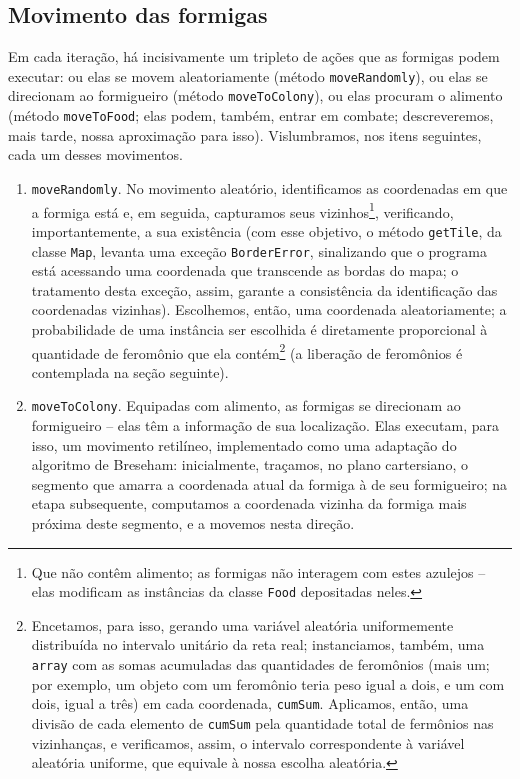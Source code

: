 \documentclass[12pt]{article}
\theoremstyle{definition}
\begin{document}
\subsection{Movimento das formigas} 

Em cada iteração, há incisivamente um tripleto de ações que as formigas podem executar: ou elas se movem aleatoriamente (método \texttt{moveRandomly}), ou elas se direcionam ao formigueiro (método \texttt{moveToColony}), ou elas procuram o alimento (método \texttt{moveToFood}; elas podem, também, entrar em combate; descreveremos, mais tarde, nossa aproximação para isso). Vislumbramos, nos itens seguintes, cada um desses movimentos. 

\begin{enumerate} 
	\item \texttt{moveRandomly}. No movimento aleatório, identificamos as coordenadas em que a formiga está e, em seguida, capturamos seus vizinhos\footnote{Que não contêm alimento; as formigas não interagem com estes azulejos -- elas modificam as instâncias da classe \texttt{Food} depositadas neles.}, verificando, importantemente, a sua existência (com esse objetivo, o método \texttt{getTile}, da classe \texttt{Map}, levanta uma exceção \texttt{BorderError}, sinalizando que o programa está acessando uma coordenada que transcende as bordas do mapa; o tratamento desta exceção, assim, garante a consistência da identificação das coordenadas vizinhas). Escolhemos, então, uma coordenada aleatoriamente; a probabilidade de uma instância ser escolhida é diretamente proporcional à quantidade de feromônio que ela contém\footnote{Encetamos, para isso, gerando uma variável aleatória uniformemente distribuída no intervalo unitário da reta real; instanciamos, também, uma \texttt{array} com as somas acumuladas das quantidades de feromônios (mais um; por exemplo, um objeto com um feromônio teria peso igual a dois, e um com dois, igual a três) em cada coordenada, \texttt{cumSum}. Aplicamos, então, uma divisão de cada elemento de \texttt{cumSum} pela quantidade total de fermônios nas vizinhanças, e verificamos, assim, o intervalo correspondente à variável aleatória uniforme, que equivale à nossa escolha aleatória.} (a liberação de feromônios é contemplada na seção seguinte). 
	\item \texttt{moveToColony}. Equipadas com alimento, as formigas se direcionam ao formigueiro -- elas têm a informação de sua localização. Elas executam, para isso, um movimento retilíneo, implementado como uma adaptação do algoritmo de Breseham: inicialmente, traçamos, no plano cartersiano, o segmento que amarra a coordenada atual da formiga à de seu formigueiro; na etapa subsequente, computamos a coordenada vizinha da formiga mais próxima deste segmento, e a movemos nesta direção.  

\end{enumerate}
\end{document}
